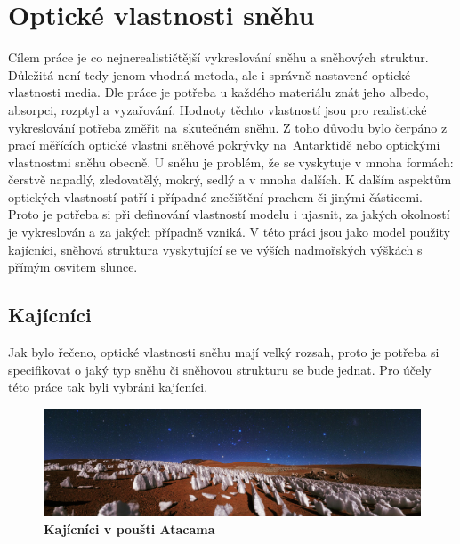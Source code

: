 \chapter{Optické vlastnosti sněhu}\label{opt-snow}
Cílem práce je co nejnerealističtější vykreslování sněhu a sněhových struktur. Důležitá není tedy jenom vhodná metoda, ale i správně nastavené optické vlastnosti media. Dle práce \cite{vevoda} je potřeba u každého materiálu znát jeho albedo, absorpci, rozptyl a vyzařování. Hodnoty těchto vlastností jsou pro realistické vykreslování potřeba změřit na~skutečném sněhu. Z toho důvodu bylo čerpáno z prací měřících optické vlastni sněhové pokrývky na~Antarktidě\cite{snow_properties}\cite{refinement_ice} nebo optickými vlastnostmi sněhu obecně\cite{soos}.
U sněhu je problém, že se vyskytuje v mnoha formách: čerstvě napadlý, zledovatělý, mokrý, sedlý a v mnoha dalších. K dalším aspektům optických vlastností patří i případné znečištění prachem či jinými částicemi. Proto je potřeba si při definování vlastností modelu i ujasnit, za jakých okolností je vykreslován a za jakých případně vzniká. V této práci jsou jako model použity kajícníci, sněhová struktura vyskytující se ve výších nadmořských výškách s přímým osvitem slunce.  
\section{Kajícníci}
Jak bylo řečeno, optické vlastnosti sněhu mají velký rozsah, proto je potřeba si specifikovat o jaký typ sněhu či sněhovou strukturu se bude jednat. Pro účely této práce tak byli vybráni kajícníci. 
\begin{figure}[h]\centering
\includegraphics[width=1\linewidth]{obrazky-figures/kajinici1.jpg}\hfill
  \caption{\textbf{Kajícníci v poušti Atacama\cite{wiki_snow}}}
  \label{2d}
\end{figure}

